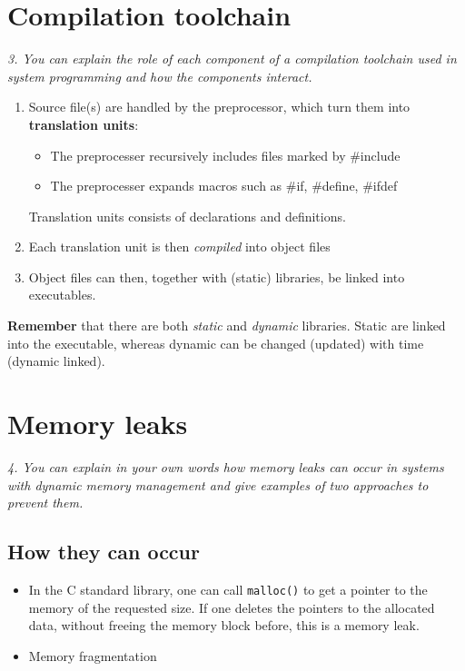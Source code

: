 \documentclass{article}
\begin{document}
\section{Compilation toolchain}
\emph{3. You can explain the role of each component of a compilation toolchain used in system programming and how the components interact.}

\begin{enumerate}
	\item Source file(s) are handled by the preprocessor, which turn them into \textbf{translation units}:
	\begin{itemize}
		\item The preprocesser recursively includes files marked by \#include
		\item The preprocesser expands macros such as \#if, \#define, \#ifdef
	\end{itemize}
	Translation units consists of declarations and definitions.
	\item Each translation unit is then \emph{compiled} into object files
	\item Object files can then, together with (static) libraries, be linked into executables.
\end{enumerate}

\textbf{Remember} that there are both \emph{static} and \emph{dynamic} libraries. Static are linked into the executable, whereas dynamic can be changed (updated) with time (dynamic linked).


\section{Memory leaks}
\emph{4. You can explain in your own words how memory leaks can occur in systems with dynamic memory management and give examples of two approaches to prevent them.}

\subsection{How they can occur}
\begin{itemize}
	\item In the C standard library, one can call \texttt{malloc()} to get a pointer to the memory of the requested size.
 If one deletes the pointers to the allocated data, without freeing the memory block before, this is a memory leak.

 	\item Memory fragmentation
\end{itemize}
\end{document}
